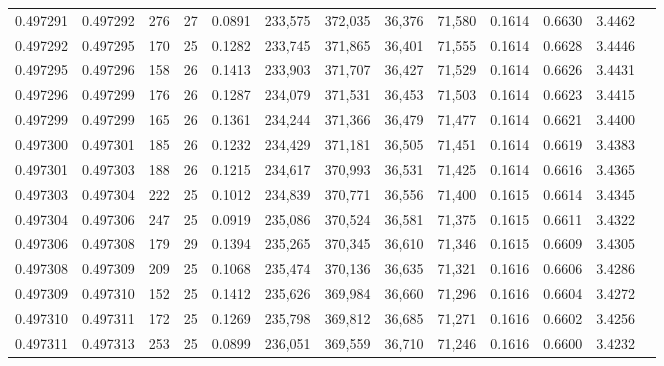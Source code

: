 \begin{tabular}{rrrrrrrrrrrrr}
0.497291 & 0.497292 & 276 &  27 &                                     0.0891 & 233,575 & 372,035 &  36,376 &  71,580 & 0.1614 & 0.6630 & 3.4462 \\
0.497292 & 0.497295 & 170 &  25 &                                     0.1282 & 233,745 & 371,865 &  36,401 &  71,555 & 0.1614 & 0.6628 & 3.4446 \\
0.497295 & 0.497296 & 158 &  26 &                                     0.1413 & 233,903 & 371,707 &  36,427 &  71,529 & 0.1614 & 0.6626 & 3.4431 \\
0.497296 & 0.497299 & 176 &  26 &                                     0.1287 & 234,079 & 371,531 &  36,453 &  71,503 & 0.1614 & 0.6623 & 3.4415 \\
0.497299 & 0.497299 & 165 &  26 &                                     0.1361 & 234,244 & 371,366 &  36,479 &  71,477 & 0.1614 & 0.6621 & 3.4400 \\
0.497300 & 0.497301 & 185 &  26 &                                     0.1232 & 234,429 & 371,181 &  36,505 &  71,451 & 0.1614 & 0.6619 & 3.4383 \\
0.497301 & 0.497303 & 188 &  26 &                                     0.1215 & 234,617 & 370,993 &  36,531 &  71,425 & 0.1614 & 0.6616 & 3.4365 \\
0.497303 & 0.497304 & 222 &  25 &                                     0.1012 & 234,839 & 370,771 &  36,556 &  71,400 & 0.1615 & 0.6614 & 3.4345 \\
0.497304 & 0.497306 & 247 &  25 &                                     0.0919 & 235,086 & 370,524 &  36,581 &  71,375 & 0.1615 & 0.6611 & 3.4322 \\
0.497306 & 0.497308 & 179 &  29 &                                     0.1394 & 235,265 & 370,345 &  36,610 &  71,346 & 0.1615 & 0.6609 & 3.4305 \\
0.497308 & 0.497309 & 209 &  25 &                                     0.1068 & 235,474 & 370,136 &  36,635 &  71,321 & 0.1616 & 0.6606 & 3.4286 \\
0.497309 & 0.497310 & 152 &  25 &                                     0.1412 & 235,626 & 369,984 &  36,660 &  71,296 & 0.1616 & 0.6604 & 3.4272 \\
0.497310 & 0.497311 & 172 &  25 &                                     0.1269 & 235,798 & 369,812 &  36,685 &  71,271 & 0.1616 & 0.6602 & 3.4256 \\
0.497311 & 0.497313 & 253 &  25 &                                     0.0899 & 236,051 & 369,559 &  36,710 &  71,246 & 0.1616 & 0.6600 & 3.4232 \\

\end{tabular}

